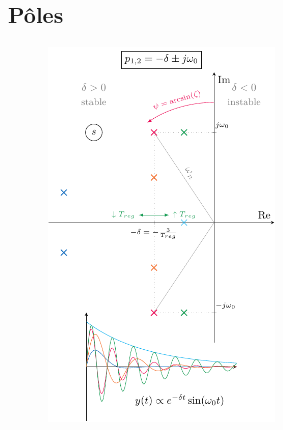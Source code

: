 \documentclass[resume]{subfiles}
\begin{document}
\subsection{Pôles}
\begin{figure}[H]
\centering
\includegraphics[width=6cm,page=1]{drwg_6.pdf}
\end{figure}
\end{document}
